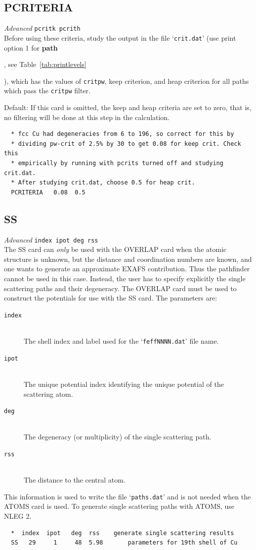 \documentclass[11pt,oneside]{report} %
\renewcommand{\htmlref}[2]{\hyperlink{#2}{#1}}
\newenvironment{Card}[4]%
      {\vspace{3ex}%
        \subsection{#1}
        \quad\textsl{#3}\newline
        \quad\texttt{#2}\newline%
        \label{card:#4}\\}
      {}
\newcommand{\file}[1]{`\texttt{#1}'}
\newcommand{\module}[1]{\textrm{\bf{#1}}}
\renewcommand{\htmlref}[2]{{#1}} %
\begin{document}
\begin{Card}{PCRITERIA}{pcritk pcrith}{Advanced}{pcr}
  Before using these criteria, study the output in the file
  \file{crit.dat} (use print option 1 for \module{path}
  \begin{latexonly}
    , see Table~\ref{tab:printlevels}
  \end{latexonly}
  ), 
  which has the values of \texttt{critpw}, keep criterion, and heap criterion 
  for all paths which pass the \texttt{critpw} filter.

  Default: If this card is omitted, the keep and heap criteria are set
  to zero, that is, no filtering will be done at this step in the
  calculation.

\begin{verbatim}
  * fcc Cu had degeneracies from 6 to 196, so correct for this by
  * dividing pw-crit of 2.5% by 30 to get 0.08 for keep crit. Check this
  * empirically by running with pcrits turned off and studying crit.dat.
  * After studying crit.dat, choose 0.5 for heap crit.
  PCRITERIA   0.08  0.5
\end{verbatim}
\end{Card}



\begin{Card}{SS}{index ipot deg rss}{Advanced}{ss}
  The SS card can {\it only} be used with the \htmlref{OVERLAP}{card:ove} card
  when the atomic structure is unknown, but the distance and coordination
  numbers are known, and one wants to generate an approximate EXAFS 
  contribution. Thus the pathfinder cannot be used in this
  case. Instead, the user has to specify explicitly the single
  scattering paths and their degeneracy. The OVERLAP card must be used
  to construct the potentials for use with the SS card. The
  parameters are:
\begin{description}
\item[\texttt{index}]\hfill\\
  The shell index and label used for the \file{feffNNNN.dat} file name.
\item[\texttt{ipot}]\hfill\\
  The unique potential index identifying the unique potential 
  of the scattering atom.
\item[\texttt{deg}]\hfill\\
  The degeneracy (or multiplicity) of the single scattering path.
\item[\texttt{rss}]\hfill\\ 
  The distance to the central atom.
\end{description}
  This information is used to write the file \file{paths.dat} and is not
  needed when the \htmlref{ATOMS}{card:ato} card is used. To generate single
  scattering paths with ATOMS, use \htmlref{NLEG}{card:nle} 2.
\begin{verbatim}
  *  index  ipot   deg  rss    generate single scattering results
  SS   29     1     48  5.98       parameters for 19th shell of Cu
\end{verbatim}
\end{Card}
\end{document}
